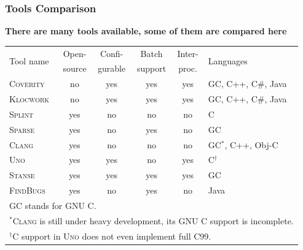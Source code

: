\documentclass[handout,xcolor=dvipsnames]{beamer}
\newcommand{\heading}[1]{\textbf{\textcolor{BurntOrange}{#1}}}
\begin{document}
\begin{frame}
\frametitle{Tools Comparison}
\heading{There are many tools available, some of them are compared here}
\begin{tabular}{l|ccccl}
\multirow{2}{*}{Tool name} &
Open- &
Confi- &
Batch &
Inter- &
\multirow{2}{*}{Languages} \\
                  & source & gurable & support & proc.  & \\ \hline
\textsc{Coverity} & no   & yes     & yes     & yes    & GC, C++, C\#, Java \\
\textsc{Klocwork} & no   & yes     & yes     & yes    & GC, C++, C\#, Java \\
\textsc{Splint}   & yes  & no      & no      & no     & C \\
\textsc{Sparse}   & yes  & no      & yes     & no     & GC \\
\textsc{Clang}    & yes  & no      & no      & no     & GC$^*$, C++, Obj-C \\
\textsc{Uno}      & yes  & yes     & no      & yes    & C$^\dagger$ \\
\textsc{Stanse}   & yes  & yes     & yes     & yes    & GC \\
\textsc{FindBugs} & yes  & no      & yes     & no     & Java \\ \hline
\multicolumn{6}{l}{\footnotesize GC stands for GNU C.} \\
\multicolumn{6}{l}{\footnotesize $^*$\textsc{Clang} is still under heavy
development, its GNU C support is incomplete.} \\
\multicolumn{6}{l}{\footnotesize $^\dagger$C support in \textsc{Uno} does not
even implement full C99.} \\
\end{tabular}
\end{frame}
\end{document}
